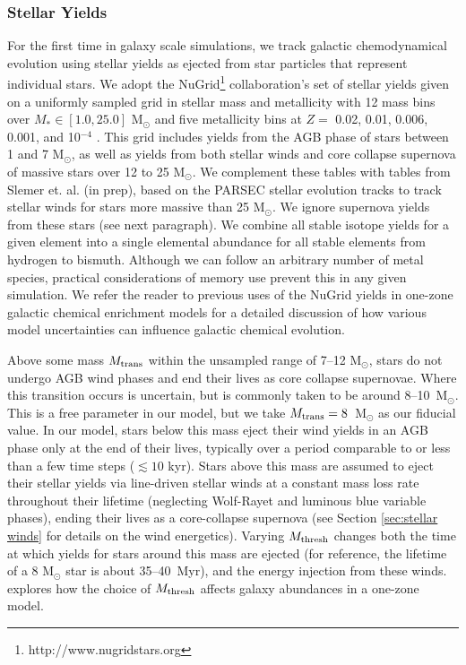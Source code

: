 \documentclass[twocolumn]{aastex61}
\begin{document}
\subsubsection{Stellar Yields}
\label{sec:yields}
For the first time in galaxy scale simulations, we track galactic chemodynamical evolution using stellar yields as ejected from star particles that represent individual stars. We adopt the NuGrid\footnote{http://www.nugridstars.org} collaboration's set of stellar yields given on a uniformly sampled grid in stellar mass and metallicity with 12 mass bins over $M_{*} \in \left[1.0, 25.0\right]$ M$_{\odot}$ and five metallicity bins at $Z =$ 0.02, 0.01, 0.006, 0.001, and 10$^{-4}$ \citep{Pignatari2016, Ritter2017}. This grid includes yields from the AGB phase of stars between 1 and 7 M$_{\odot}$, as well as yields from both stellar winds and core collapse supernova of massive stars over 12 to 25 M$_{\odot}$. We complement these tables with tables from Slemer et. al. (in prep), based on the PARSEC stellar evolution tracks \citep{Bressan2012, Tang2014} to track stellar winds for stars more massive than 25 M$_{\odot}$. We ignore supernova yields from these stars (see next paragraph). We combine all stable isotope yields for a given element into a single elemental abundance for all stable elements from hydrogen to bismuth. Although we can follow an arbitrary number of metal species, practical considerations of memory use prevent this in any given simulation. We refer the reader to previous uses of the NuGrid yields in one-zone galactic chemical enrichment models \citep{Cote2016,  Cote2016_feb,Cote2017} for a detailed discussion of how various model uncertainties can influence galactic chemical evolution.

Above some mass $M_{\rm trans}$ within the unsampled range of 7--12 M$_{\odot}$, stars do not undergo AGB wind phases and end their lives as core collapse supernovae. Where this transition occurs is uncertain, but is commonly taken to be around 8--10~M$_{\odot}$. This is a free parameter in our model, but we take $M_{\rm trans} = 8$~M$_{\odot}$ as our fiducial value. In our model, stars below this mass eject their wind yields in an AGB phase only at the end of their lives, typically over a period comparable to or less than a few time steps ($\lesssim 10$ kyr). Stars above this mass are assumed to eject their stellar yields via line-driven stellar winds at a constant mass loss rate throughout their lifetime (neglecting Wolf-Rayet and luminous blue variable phases), ending their lives as a core-collapse supernova (see Section \ref{sec:stellar winds} for details on the wind energetics). Varying $M_{\rm thresh}$ changes both the time at which yields for stars around this mass are ejected (for reference, the lifetime of a 8 M$_{\odot}$ star is about 35--40~Myr), and the energy injection from these winds. \citet{Cote2017} explores how the choice of $M_{\rm thresh}$ affects galaxy abundances in a one-zone model.
\end{document}
